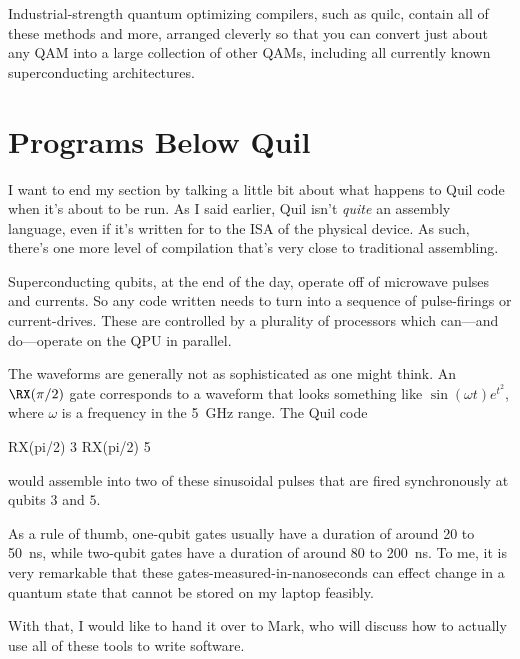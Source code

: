 Industrial-strength quantum optimizing compilers, such as quilc, contain all of these methods and more, arranged cleverly so that you can convert just about any QAM into a large collection of other QAMs, including all currently known superconducting architectures.

\section{Programs Below Quil}

I want to end my section by talking a little bit about what happens to Quil code when it's about to be run. As I said earlier, Quil isn't \emph{quite} an assembly language, even if it's written for to the ISA of the physical device. As such, there's one more level of compilation that's very close to traditional assembling.

Superconducting qubits, at the end of the day, operate off of microwave pulses and currents. So any code written needs to turn into a sequence of pulse-firings or current-drives. These are controlled by a plurality of processors which can---and do---operate on the QPU in parallel.

The waveforms are generally not as sophisticated as one might think. An $\RX(\pi/2)$ gate corresponds to a waveform that looks something like $\sin(\omega t)e^{t^2}$, where $\omega$ is a frequency in the 5~GHz range. The Quil code
\begin{quil}
RX(pi/2) 3
RX(pi/2) 5
\end{quil}
would assemble into two of these sinusoidal pulses that are fired synchronously at qubits $3$ and $5$.

As a rule of thumb, one-qubit gates usually have a duration of around 20 to 50~ns, while two-qubit gates have a duration of around 80 to 200~ns. To me, it is very remarkable that these gates-measured-in-nanoseconds can effect change in a quantum state that cannot be stored on my laptop feasibly.

With that, I would like to hand it over to Mark, who will discuss how to actually use all of these tools to write software.
